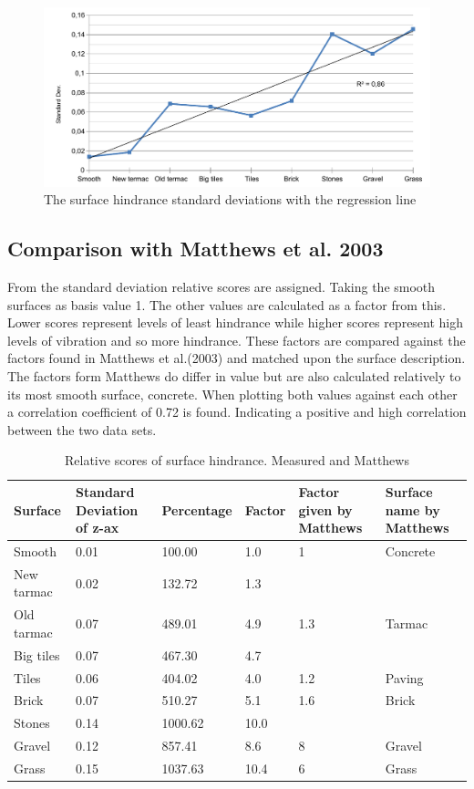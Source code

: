 \begin{figure}[ht]
\includegraphics[width=\textwidth]{img/R_statistics_surfaces2.pdf}
\centering
\caption{The surface hindrance standard deviations with the regression line \label{hindrance2}}
\end{figure} 
\clearpage

\subsection{Comparison with Matthews et al. 2003}
From the standard deviation relative scores are assigned. Taking the smooth surfaces as basis value 1. The other values are calculated as a factor from this. Lower scores represent levels of least hindrance while higher scores represent high levels of vibration and so more hindrance. These factors are compared against the factors found in Matthews et al.(2003) and matched upon the surface description. The factors form Matthews do differ in value but are also calculated relatively to its most smooth surface, concrete. When plotting both values against each other a correlation coefficient of 0.72 is found. Indicating a positive and high correlation between the two data sets. 

\begin{table}[ht]
\caption[Relative scores of surface hindrance.]{Relative scores of surface hindrance. Measured and Matthews \label{compare}}
\centering
\begin{tabular}{|l|p{1.5cm}|l|l|p{1.5cm}|p{1.5cm}|}
\hline
Surface & Standard Deviation of z-ax & Percentage & Factor & Factor given by Matthews & Surface name by Matthews \\
\hline
Smooth & 0.01 & 100.00 & 1.0 & 1 & Concrete \\
New tarmac & 0.02 & 132.72 & 1.3 & & \\
Old tarmac & 0.07 & 489.01 & 4.9 & 1.3 & Tarmac \\
Big tiles & 0.07 & 467.30 & 4.7 &  & \\
Tiles & 0.06 & 404.02 & 4.0 & 1.2 & Paving \\
Brick & 0.07 & 510.27 & 5.1 & 1.6 & Brick \\
Stones & 0.14 & 1000.62 & 10.0 & & \\
Gravel & 0.12 & 857.41 & 8.6 & 8 & Gravel \\
Grass & 0.15 & 1037.63 & 10.4 & 6 & Grass \\
\hline 
\end{tabular}
\end{table}

